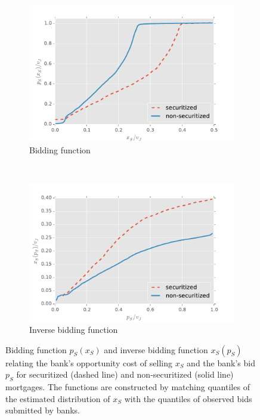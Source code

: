 \documentclass[11pt,twopage]{article}
\begin{document}
\begin{figure}
  \begin{center}
    \begin{subfigure}[b]{0.5\textwidth}
      \centering
      \includegraphics[width=\textwidth]{graphics/ps_xs_semiparametric}
      \caption{Bidding function\label{fig:ps-xs-sec-nonsec}}
    \end{subfigure}%
    ~%
    \begin{subfigure}[b]{0.5\textwidth}
      \centering
      \includegraphics[width=\textwidth]{graphics/xs_ps_semiparametric}
      \caption{Inverse bidding function\label{fig:xs-ps-sec-nonsec}}
    \end{subfigure}
    \caption{Bidding function $p_S(x_S)$ and inverse bidding function
      $x_S(p_S)$ relating the bank's opportunity cost of selling $x_S$
      and the bank's bid $p_S$ for securitized (dashed line) and
      non-securitized (solid line) mortgages. The functions are
      constructed by matching quantiles of the estimated distribution
      of $x_S$ with the quantiles of observed bids submitted by
      banks.}
  \end{center}
\end{figure}
\end{document}
